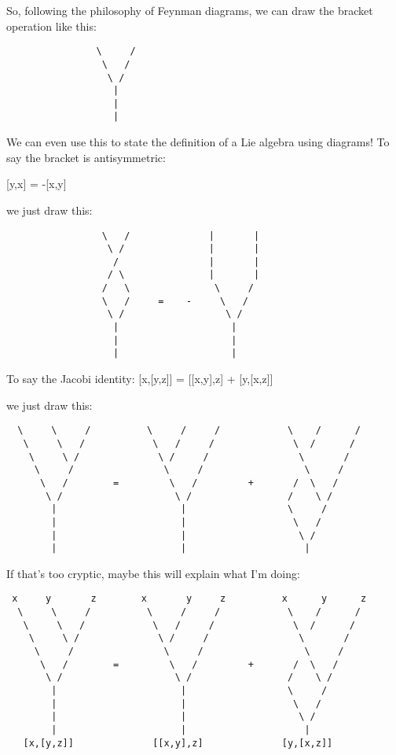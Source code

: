 So, following the philosophy of Feynman diagrams, we can draw the 
bracket operation like this:
\begin{verbatim}
                \     /
                 \   /
                  \ /
                   |
                   |
                   |
\end{verbatim}
    
We can even use this to state the definition of a Lie algebra using 
diagrams!  To say the bracket is antisymmetric:

[y,x] = -[x,y]

we just draw this:
\begin{verbatim}
                 \   /              |       |
                  \ /               |       |
                   /                |       |
                  / \               |       |
                 /   \               \     /
                 \   /     =    -     \   /
                  \ /                  \ /
                   |                    |
                   |                    |
                   |                    |
\end{verbatim}
    

To say the Jacobi identity:
[x,[y,z]] = [[x,y],z] + [y,[x,z]]

we just draw this:
\begin{verbatim}
  \     \     /          \     /     /            \    /      /   
   \     \   /            \   /     /              \  /      /
    \     \ /              \ /     /                \       / 
     \     /                \     /                  \     /
      \   /        =         \   /         +       /  \   /
       \ /                    \ /                 /    \ /
        |                      |                  \     /
        |                      |                   \   /
        |                      |                    \ /
        |                      |                     |
\end{verbatim}
    
If that's too cryptic, maybe this will explain what I'm doing:
\begin{verbatim}
 x     y       z        x       y     z          x      y      z
  \     \     /          \     /     /            \    /      /   
   \     \   /            \   /     /              \  /      /
    \     \ /              \ /     /                \       / 
     \     /                \     /                  \     /
      \   /        =         \   /         +       /  \   /
       \ /                    \ /                 /    \ /
        |                      |                  \     /
        |                      |                   \   /
        |                      |                    \ /
        |                      |                     |
   [x,[y,z]]              [[x,y],z]              [y,[x,z]]
\end{verbatim}
    
